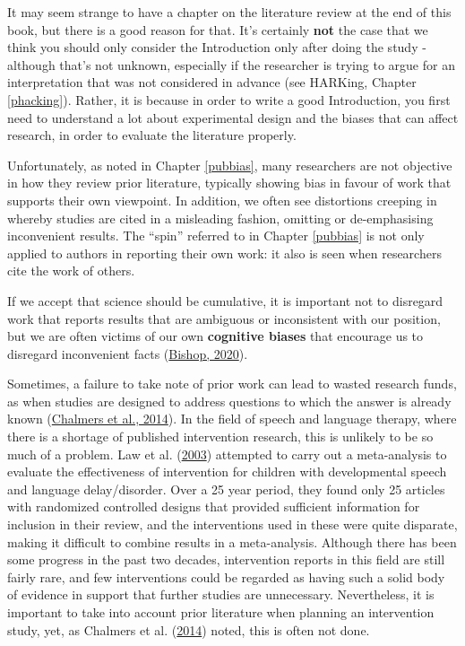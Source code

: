 \documentclass{krantz}
\begin{document}
It may seem strange to have a chapter on the literature review at the end of this book, but there is a good reason for that. It's certainly \textbf{not} the case that we think you should only consider the Introduction only after doing the study - although that's not unknown, especially if the researcher is trying to argue for an interpretation that was not considered in advance (see HARKing, Chapter \ref{phacking}). Rather, it is because in order to write a good Introduction, you first need to understand a lot about experimental design and the biases that can affect research, in order to evaluate the literature properly.

Unfortunately, as noted in Chapter \ref{pubbias}, many researchers are not objective in how they review prior literature, typically showing bias in favour of work that supports their own viewpoint. In addition, we often see distortions creeping in whereby studies are cited in a misleading fashion, omitting or de-emphasising inconvenient results. The ``spin'' referred to in Chapter \ref{pubbias} is not only applied to authors in reporting their own work: it also is seen when researchers cite the work of others.

If we accept that science should be cumulative, it is important not to disregard work that reports results that are ambiguous or inconsistent with our position, but we are often victims of our own \textbf{cognitive biases} that encourage us to disregard inconvenient facts (\protect\hyperlink{ref-bishop2020}{Bishop, 2020}).

Sometimes, a failure to take note of prior work can lead to wasted research funds, as when studies are designed to address questions to which the answer is already known (\protect\hyperlink{ref-chalmers2014}{Chalmers et al., 2014}). In the field of speech and language therapy, where there is a shortage of published intervention research, this is unlikely to be so much of a problem. Law et al. (\protect\hyperlink{ref-law2003}{2003}) attempted to carry out a meta-analysis to evaluate the effectiveness of intervention for children with developmental speech and language delay/disorder. Over a 25 year period, they found only 25 articles with randomized controlled designs that provided sufficient information for inclusion in their review, and the interventions used in these were quite disparate, making it difficult to combine results in a meta-analysis. Although there has been some progress in the past two decades, intervention reports in this field are still fairly rare, and few interventions could be regarded as having such a solid body of evidence in support that further studies are unnecessary. Nevertheless, it is important to take into account prior literature when planning an intervention study, yet, as Chalmers et al. (\protect\hyperlink{ref-chalmers2014}{2014}) noted, this is often not done.
\end{document}
